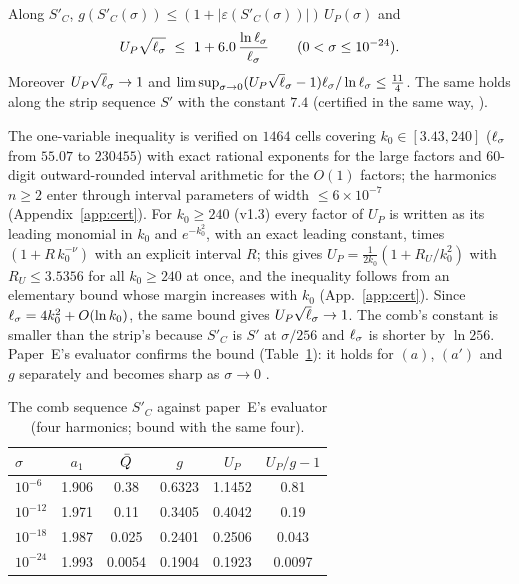 \begin{theorem} 
\label{thm:AZ1P}
Along $S'_C$, $g(S'_C(\sigma))\le(1+|\varepsilon(S'_C(\sigma))|)\,U_P(\sigma)$ and
\begin{equation}
U_P\sqrt{\ls}\ \le\ 1+6.0\,\frac{\ln\ls}{\ls}\qquad(0<\sigma\le10^{-24}).
\end{equation}
Moreover $U_P\sqrt\ls\to1$ and $\limsup_{\sigma\to0}(U_P\sqrt\ls-1)\ls/\ln\ls\le\frac{11}4$.
The same holds along the strip sequence $S'$ with the constant $7.4$ (certified in the same way, ).
\end{theorem}

The one-variable inequality is verified on $1464$ cells covering $k_0\in[3.43,240]$ ($\ell_\sigma$ from $55.07$ to $230455$) with exact rational
exponents for the large factors and $60$-digit outward-rounded interval arithmetic for the $O(1)$ factors; the harmonics $n\ge2$ enter
through interval parameters of width $\le6\times10^{-7}$ (Appendix~\ref{app:cert}). For $k_0\ge240$ (v1.3) every factor of $U_P$ is written as its
leading monomial in $k_0$ and $e^{-k_0^2}$, with an exact leading constant, times $(1+R\,k_0^{-\nu})$ with an explicit interval $R$; this gives
$U_P=\frac1{2k_0}(1+R_U/k_0^2)$ with $R_U\le3.5356$ for all $k_0\ge240$ at once, and the inequality follows from an elementary bound whose margin increases
with $k_0$ (App.~\ref{app:cert}). Since $\ell_\sigma=4k_0^2+O(\ln k_0)$, the same bound gives $U_P\sqrt\ls\to1$. The comb's constant is smaller than the strip's because
$S'_C$ is $S'$ at $\sigma/256$ and $\ell_\sigma$ is shorter by $\ln256$. Paper~E's evaluator confirms the bound (Table~\ref{tab:upper}): it holds
for $(a)$, $(a')$ and $g$ separately and becomes sharp as $\sigma\to0$ \numst.

\begin{table}
\caption{The comb sequence $S'_C$ against paper~E's evaluator (four harmonics; bound with the same four).}
\label{tab:upper}
\begin{ruledtabular}
\begin{tabular}{lccccc}
$\sigma$ & $a_1$ & $\bar Q$ & $g$ & $U_P$ & $U_P/g-1$\\ \hline
$10^{-6}$ & 1.906 & 0.38 & 0.6323 & 1.1452 & 0.81\\
$10^{-12}$ & 1.971 & 0.11 & 0.3405 & 0.4042 & 0.19\\
$10^{-18}$ & 1.987 & 0.025 & 0.2401 & 0.2506 & 0.043\\
$10^{-24}$ & 1.993 & 0.0054 & 0.1904 & 0.1923 & 0.0097\\
\end{tabular}
\end{ruledtabular}
\end{table}

